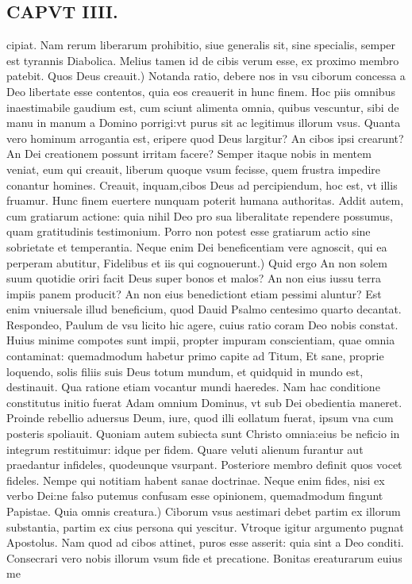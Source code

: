 \documentclass{article}
\begin{document}
\begin{pages}
\section*{CAPVT IIII. }
\marginpar{[ p.47 ]}\pstart cipiat. Nam rerum liberarum prohibitio, siue generalis sit, sine specialis, semper est tyrannis Diabolica. Melius tamen id de cibis verum esse, ex proximo membro patebit.  \pend\pstart Quos Deus creauit.) Notanda ratio, debere nos in vsu ciborum concessa a Deo libertate esse contentos, quia eos creauerit in hunc finem. Hoc piis omnibus inaestimabile gaudium est, cum sciunt alimenta omnia, quibus vescuntur, sibi de manu in manum a Domino porrigi:vt purus sit ac legitimus illorum vsus. Quanta vero hominum arrogantia est, eripere quod Deus largitur? An cibos ipsi crearunt? An Dei creationem possunt irritam facere? Semper itaque nobis in mentem veniat, eum qui creauit, liberum quoque vsum fecisse, quem frustra impedire conantur homines. Creauit, inquam,cibos Deus ad percipiendum, hoc est, vt illis fruamur. Hunc finem euertere nunquam poterit humana authoritas. Addit autem, cum gratiarum actione: quia nihil Deo pro sua liberalitate rependere possumus, quam gratitudinis testimonium. Porro non potest esse gratiarum actio sine sobrietate et temperantia. Neque enim Dei beneficentiam vere agnoscit, qui ea perperam abutitur,  \pend\pstart Fidelibus et iis qui cognouerunt.) Quid ergo An non solem suum quotidie oriri facit Deus super bonos et malos? An non eius iussu terra impiis panem producit? An non eius benedictiont etiam pessimi aluntur? Est enim vniuersale illud beneficium, quod Dauid Psalmo centesimo quarto decantat. Respondeo, Paulum de vsu licito hic agere, cuius ratio coram Deo nobis constat. Huius minime compotes sunt impii, propter impuram conscientiam, quae omnia contaminat: quemadmodum habetur primo capite ad Titum, Et sane, proprie loquendo, solis filiis suis Deus totum mundum, et quidquid in mundo est, destinauit. Qua ratione etiam vocantur mundi haeredes. Nam hac conditione constitutus initio fuerat Adam omnium Dominus, vt sub Dei obedientia maneret. Proinde rebellio aduersus Deum, iure, quod illi eollatum fuerat, ipsum vna cum posteris spoliauit. Quoniam autem subiecta sunt Christo omnia:eius be neficio in integrum restituimur: idque per fidem. Quare veluti alienum furantur aut praedantur infideles, quodeunque vsurpant. Posteriore membro definit quos vocet fideles. Nempe qui notitiam habent sanae doctrinae. Neque enim fides, nisi ex verbo Dei:ne falso putemus confusam esse opinionem, quemadmodum fingunt Papistae. Quia omnis creatura.) Ciborum vsus aestimari debet partim ex illorum substantia, partim ex cius persona qui yescitur. Vtroque igitur argumento pugnat Apostolus. Nam quod ad cibos attinet, puros esse asserit: quia sint a Deo conditi. Consecrari vero nobis illorum vsum fide et precatione. Bonitas ereaturarum euius me\pend

\end{pages}
\end{document}
